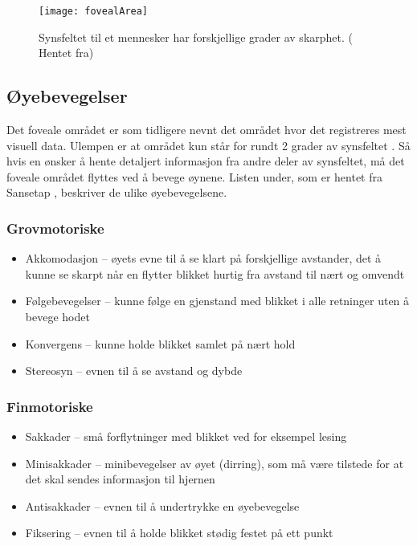 \begin{figure}[ht!]
\centering
\texttt{[image: fovealArea]}
\caption{Synsfeltet til et mennesker har forskjellige grader av skarphet. ( Hentet fra\cite{VisualImage})}
\label{fig:visueltArea}
\end{figure}

\subsection{Øyebevegelser}

Det foveale området er som tidligere nevnt det området hvor det registreres mest visuell data. Ulempen er at området kun står for rundt 2 grader av synsfeltet \cite{Backg0:online}. Så hvis en ønsker å hente detaljert informasjon fra andre deler av synsfeltet, må det foveale området flyttes ved å bevege øynene. Listen under, som er hentet fra Sansetap \cite{sanse7:online}, beskriver de ulike øyebevegelsene.


\subsubsection{Grovmotoriske}
\begin{itemize}
\item Akkomodasjon – øyets evne til å se klart på forskjellige avstander, det å kunne se skarpt når en flytter blikket hurtig fra avstand til nært og omvendt
\item Følgebevegelser – kunne følge en gjenstand med blikket i alle retninger uten å bevege hodet
\item Konvergens – kunne holde blikket samlet på nært hold
\item Stereosyn – evnen til å se avstand og dybde
\end{itemize}
\subsubsection{Finmotoriske}
\begin{itemize}
\item Sakkader – små forflytninger med blikket ved for eksempel lesing
\item Minisakkader – minibevegelser av øyet (dirring), som må være tilstede for at det skal sendes informasjon til hjernen
\item Antisakkader – evnen til å undertrykke en øyebevegelse
\item Fiksering – evnen til å holde blikket stødig festet på ett punkt
\end{itemize}



